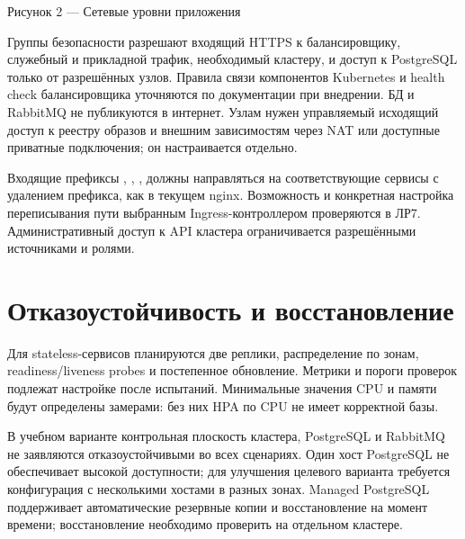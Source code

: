 \documentclass[14pt,a4paper]{extarticle}
\newcommand{\code}[1]{\texttt{\detokenize{#1}}}
\begin{document}
\begin{center}

Рисунок 2 --- Сетевые уровни приложения
\end{center}
Группы безопасности разрешают входящий HTTPS к балансировщику, служебный и прикладной трафик, необходимый кластеру, и доступ к PostgreSQL только от разрешённых узлов. Правила связи компонентов Kubernetes и health check балансировщика уточняются по документации при внедрении. БД и RabbitMQ не публикуются в интернет. Узлам нужен управляемый исходящий доступ к реестру образов и внешним зависимостям через NAT или доступные приватные подключения; он настраивается отдельно.

Входящие префиксы \code{/identity/}, \code{/catalog/}, \code{/booking/}, \code{/review/} должны направляться на соответствующие сервисы с удалением префикса, как в текущем nginx. Возможность и конкретная настройка переписывания пути выбранным Ingress-контроллером проверяются в ЛР7. Административный доступ к API кластера ограничивается разрешёнными источниками и ролями.
\section{Отказоустойчивость и восстановление}
Для stateless-сервисов планируются две реплики, распределение по зонам, readiness/liveness probes и постепенное обновление. Метрики и пороги проверок подлежат настройке после испытаний. Минимальные значения CPU и памяти будут определены замерами: без них HPA по CPU не имеет корректной базы.

В учебном варианте контрольная плоскость кластера, PostgreSQL и RabbitMQ не заявляются отказоустойчивыми во всех сценариях. Один хост PostgreSQL не обеспечивает высокой доступности; для улучшения целевого варианта требуется конфигурация с несколькими хостами в разных зонах. Managed PostgreSQL поддерживает автоматические резервные копии и восстановление на момент времени; восстановление необходимо проверить на отдельном кластере.
\end{document}
